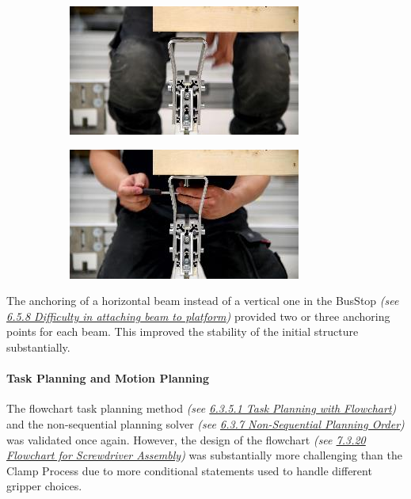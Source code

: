 \documentclass[11pt]{book}
\begin{document}
\begin{figure}[H]
\centering
\begin{subfigure}[b]{0.45\textwidth}
\centering
\includegraphics[width=\textwidth]{./images/image80.jpeg}
\end{subfigure}
\hfill
\begin{subfigure}[b]{0.45\textwidth}
\centering
\includegraphics[width=\textwidth]{./images/image81.jpeg}
\end{subfigure}
\end{figure}


The anchoring of a horizontal beam instead of a vertical one in the BusStop \textit{(see \uline{6.5.8 Difficulty in attaching beam to platform})} provided two or three anchoring points for each beam. This improved the stability of the initial structure substantially.

\paragraph{Task Planning and Motion Planning}

The flowchart task planning method \textit{(see \uline{6.3.5.1 Task Planning with Flowchart})} and the non-sequential planning solver \textit{(see \uline{6.3.7 Non-Sequential Planning Order}) }was validated once again. However, the design of the flowchart \textit{(see \uline{7.3.20 Flowchart for Screwdriver Assembly})} was substantially more challenging than the Clamp Process due to more conditional statements used to handle different gripper choices. 
\end{document}
